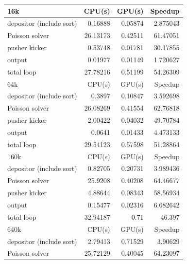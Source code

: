 \begin{table}
  \centering
  \begin{tabular}{|l|r|r|r|}
    \hline
    16k                      &    CPU(s)      &     GPU(s)    &  Speedup    \\
    \hline
    depositor (include sort) &    0.16888     &     0.05874   &  2.875043   \\
    Poisson solver           &    26.13173    &     0.42511   &  61.47051   \\
    pusher kicker            &    0.53748	  &     0.01781	  &  30.17855   \\
    output                   &    0.01977     &     0.01149   &  1.720627   \\
    total loop               &    27.78216    &     0.51199   &  54.26309   \\
    \hline
    64k                      &    CPU(s)      &     GPU(s)    &  Speedup    \\
    \hline
    depositor (include sort) &    0.3897      &     0.10847   &  3.592698   \\
    Poisson solver           &    26.08269    &     0.41554   &  62.76818   \\
    pusher kicker            &    2.00422	  &     0.04032	  &  49.70784   \\
    output                   &    0.0641      &     0.01433   &  4.473133   \\
    total loop               &    29.54123    &     0.57598   &  51.28864   \\
    \hline
    160k                     &    CPU(s)      &     GPU(s)    &  Speedup    \\
    \hline
    depositor (include sort) &    0.82705     &     0.20731   &  3.989436   \\
    Poisson solver           &    25.9208     &     0.40208   &  64.46677   \\
    pusher kicker            &    4.88644	  &     0.08343	  &  58.56934   \\
    output                   &    0.15477     &     0.02316   &  6.682642   \\
    total loop               &    32.94187    &     0.71      &  46.397     \\
    \hline
    640k                     &    CPU(s)      &     GPU(s)    &  Speedup    \\
    \hline
    depositor (include sort) &    2.79413     &     0.71529   &  3.90629    \\
    Poisson solver           &    25.72129    &     0.40045   &  64.23097   \\

\end{tabular}
\end{table}
